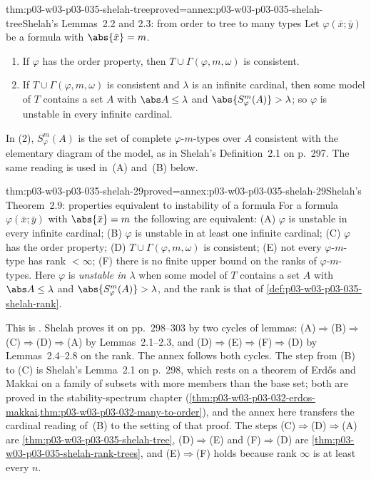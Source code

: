 \begin{hblemma}{thm:p03-w03-p03-035-shelah-tree}{proved=annex:p03-w03-p03-035-shelah-tree}{Shelah's Lemmas~2.2 and 2.3: from order to tree to many types}
Let \(\varphi(\bar x;\bar y)\) be a formula with \(\abs{\bar x}=m\).
\begin{enumerate}
  \item If \(\varphi\) has the order property, then
        \(T\cup\Gamma(\varphi,m,\omega)\) is consistent.
  \item If \(T\cup\Gamma(\varphi,m,\omega)\) is consistent and \(\lambda\) is
        an infinite cardinal, then some model of \(T\) contains a set \(A\)
        with \(\abs A\leq\lambda\) and \(\abs{S^m_\varphi(A)}>\lambda\); so
        \(\varphi\) is unstable in every infinite cardinal.
\end{enumerate}
\end{hblemma}

In (2), \(S^m_\varphi(A)\) is the set of complete \(\varphi\)-\(m\)-types over
\(A\) consistent with the elementary diagram of the model, as in Shelah's
Definition~2.1 on p.~297.  The same reading is used in~(A) and~(B) below.

\begin{hbtheorem}{thm:p03-w03-p03-035-shelah-29}{proved=annex:p03-w03-p03-035-shelah-29}{Shelah's Theorem~2.9: properties equivalent to instability of a formula}
For a formula \(\varphi(\bar x;\bar y)\) with \(\abs{\bar x}=m\) the
following are equivalent:
\textup{(A)} \(\varphi\) is unstable in every infinite cardinal;
\textup{(B)} \(\varphi\) is unstable in at least one infinite cardinal;
\textup{(C)} \(\varphi\) has the order property;
\textup{(D)} \(T\cup\Gamma(\varphi,m,\omega)\) is consistent;
\textup{(E)} not every \(\varphi\)-\(m\)-type has rank \(<\infty\);
\textup{(F)} there is no finite upper bound on the ranks of
\(\varphi\)-\(m\)-types.
Here \(\varphi\) is \emph{unstable in \(\lambda\)} when some model of \(T\)
contains a set \(A\) with \(\abs A\leq\lambda\) and
\(\abs{S^m_\varphi(A)}>\lambda\), and the rank is that of
\cref{def:p03-w03-p03-035-shelah-rank}.
\end{hbtheorem}

This is \cite[Theorem~2.9, p.~303]{Shelah1971Stability}.  Shelah proves it
on pp.~298--303 by two cycles of lemmas:
(A)\(\Rightarrow\)(B)\(\Rightarrow\)(C)\(\Rightarrow\)(D)\(\Rightarrow\)(A)
by Lemmas~2.1--2.3, and (D)\(\Rightarrow\)(E)\(\Rightarrow\)(F)\(\Rightarrow\)(D)
by Lemmas~2.4--2.8 on the rank.  The annex follows both cycles.  The step
from (B) to (C) is Shelah's Lemma~2.1 on p.~298, which rests on a theorem of
Erd\H{o}s and Makkai on a family of subsets with more members than the base
set; both are proved in the stability-spectrum chapter
(\cref{thm:p03-w03-p03-032-erdos-makkai,thm:p03-w03-p03-032-many-to-order}),
and the annex here transfers the cardinal reading of~(B) to the setting of
that proof.  The steps (C)\(\Rightarrow\)(D)\(\Rightarrow\)(A) are
\cref{thm:p03-w03-p03-035-shelah-tree}, (D)\(\Rightarrow\)(E) and
(F)\(\Rightarrow\)(D) are \cref{thm:p03-w03-p03-035-shelah-rank-trees}, and
(E)\(\Rightarrow\)(F) holds because rank \(\infty\) is at least every
\(n\).

